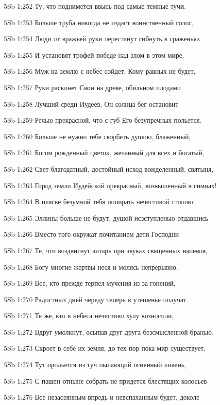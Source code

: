 \vs 5Sb 1:252 Ту, что поднимется ввысь под самые темные тучи. 

\vs 5Sb 1:253 Больше труба никогда не издаст воинственный голос, 

\vs 5Sb 1:254 Люди от вражьей руки перестанут гибнуть в сраженьях

\vs 5Sb 1:255 И установят трофей победе над злом в этом мире.

\vs 5Sb 1:256 Муж на землю с небес сойдет, Кому равных не будет, 

\vs 5Sb 1:257 Руки раскинет Свои на древе, обильном плодами. 

\vs 5Sb 1:258 Лучший среди Иудеев, Он солнца бег остановит 

\vs 5Sb 1:259 Речью прекрасной, что с губ Его безупречных польется.

\vs 5Sb 1:260 Больше не нужно тебе скорбеть душою, блаженный, 

\vs 5Sb 1:261 Богом рожденный цветок, желанный для всех и богатый, 

\vs 5Sb 1:262 Свет благодатный, достойный исход вожделенный, святыня, 

\vs 5Sb 1:263 Город земли Иудейской прекрасный, возвышенный в гимнах! 

\vs 5Sb 1:264 В пляске безумной тебя попирать нечестивой стопою

\vs 5Sb 1:265 Эллины больше не будут, душой исзступленью отдавшись  

\vs 5Sb 1:266 Вместо того окружат почитанием дети Господни  

\vs 5Sb 1:267 Те, что воздвигнут алтарь при звуках священных напевов, 

\vs 5Sb 1:268 Богу многие жертвы неся и молясь непрерывно. 

\vs 5Sb 1:269 Все, кто прежде терпел мучения из-за гонений,

\vs 5Sb 1:270 Радостных дней череду теперь в утешенье получат  

\vs 5Sb 1:271 Те же, кто в небеса нечестиво хулу возносили, 

\vs 5Sb 1:272 Вдруг умолкнут, осыпав друг друга безсмысленной бранью. 

\vs 5Sb 1:273 Скроет в себе их земля, до тех пор пока мир существует. 

\vs 5Sb 1:274 Тут прольется из туч пылающий огненный ливень,

\vs 5Sb 1:275 С пашен отныне собрать не придется блестящих колосьев  

\vs 5Sb 1:276 Все незасеянным впредь и невспаханным будет, доколе 

